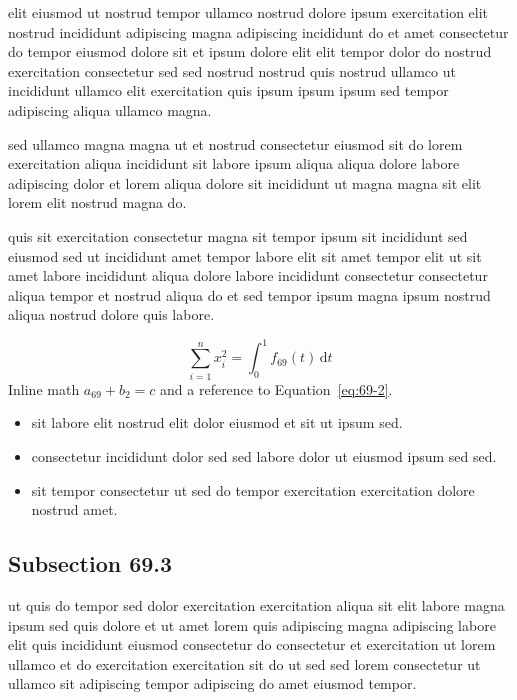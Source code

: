 \documentclass{article}
\begin{document}
elit eiusmod ut nostrud tempor ullamco nostrud dolore ipsum exercitation elit nostrud incididunt adipiscing magna adipiscing incididunt do et amet consectetur do tempor eiusmod dolore sit et ipsum dolore elit elit tempor dolor do nostrud exercitation consectetur sed sed nostrud nostrud quis nostrud ullamco ut incididunt ullamco elit exercitation quis ipsum ipsum ipsum sed tempor adipiscing aliqua ullamco magna.

sed ullamco magna magna ut et nostrud consectetur eiusmod sit do lorem exercitation aliqua incididunt sit labore ipsum aliqua aliqua dolore labore adipiscing dolor et lorem aliqua dolore sit incididunt ut magna magna sit elit lorem elit nostrud magna do.

quis sit exercitation consectetur magna sit tempor ipsum sit incididunt sed eiusmod sed ut incididunt amet tempor labore elit sit amet tempor elit ut sit amet labore incididunt aliqua dolore labore incididunt consectetur consectetur aliqua tempor et nostrud aliqua do et sed tempor ipsum magna ipsum nostrud aliqua nostrud dolore quis labore.

\begin{equation}\label{eq:69-2}
  \sum_{i=1}^{n} x_i^{2} = \int_0^1 f_{69}(t)\,\mathrm{d}t
\end{equation}
Inline math $a_{69} + b_{2} = c$ and a reference to Equation~\eqref{eq:69-2}.

\begin{itemize}
  \item sit labore elit nostrud elit dolor eiusmod et sit ut ipsum sed.
  \item consectetur incididunt dolor sed sed labore dolor ut eiusmod ipsum sed sed.
  \item sit tempor consectetur ut sed do tempor exercitation exercitation dolore nostrud amet.
\end{itemize}

\subsection{Subsection 69.3}\label{sec:69-3}
ut quis do tempor sed dolor exercitation exercitation aliqua sit elit labore magna ipsum sed quis dolore et ut amet lorem quis adipiscing magna adipiscing labore elit quis incididunt eiusmod consectetur do consectetur et exercitation ut lorem ullamco et do exercitation exercitation sit do ut sed sed lorem consectetur ut ullamco sit adipiscing tempor adipiscing do amet eiusmod tempor.
\end{document}
